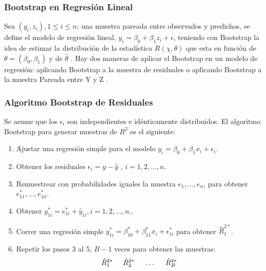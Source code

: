\subsubsection{Bootstrap en Regresión Lineal}

Sea $(y_{i}, z_{i}),  1 \leq  i \leq n$; una muestra pareada entre observados y predichos, se define el modelo de regresión lineal, $ y_{i} = \beta_{0} + \beta_{1}z_{i} +\epsilon $, teniendo con Bootstrap la idea de  estimar la distribución de la estadística $R( \chi, \theta)$ que esta en función de $\theta = (\beta_{0}, \beta_{1}) $ y de $\hat{\theta}$ \parencite{zacarias-2023}. Hay dos maneras de aplicar el Bootstrap
en un modelo de regresión: aplicando Bootstrap a la muestra de residuales o aplicando Bootstrap a la muestra Pareada entre Y y Z \parencite{balam-2012}.\\


\subsubsection{Algoritmo Bootstrap de Residuales}

Se asume que los $ \epsilon_{i} $ son independientes e idénticamente distribuidos. El algoritmo Bootstrap para generar muestras de $ R^{2} $ es el siguiente:

\begin{enumerate}
	\item Ajustar una regresión simple para el modelo $ y_{i} = \beta_{0} +\beta_{1}x_{i} + \epsilon_{i} $.
	
	\item Obtener los residuales $ \epsilon_{i} = y - \hat{y}   $
	, $i = 1,2,\dots, n $.
	
	\item  Remuestrear con probabilidades iguales la muestra $ e_{1},\dots,e_{n} $, para obtener $e^{*}_{11},...,e^{*}_{1n}$.
	\item Obtener $ y^{*}_{1i} = e^{*}_{1i} + \hat{y}_{1i}, i = 1,2, \dots, n. $.
	
	\item Correr una regresión simple $ y^{*}_{1i} = \beta^{*}_{10} +\beta^{*}_{11}x_{i} + \epsilon^{*}_{1i} $ para obtener $ \hat{R}^{2*}_{1} $.
	
	\item Repetir los pasos 3 al 5, $B - 1$ veces para obtener las muestras: 
	\[
	\hat{R}^{2*}_{1} \hspace{.5cm} \hat{R}^{2*}_{2} \hspace{.5cm} \dots \hspace{.5cm} \hat{R}^{2*}_{B}
	\]
\end{enumerate}



